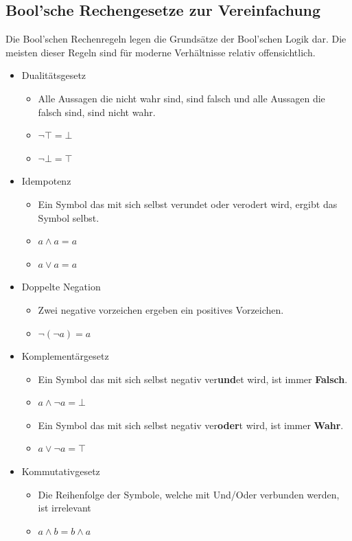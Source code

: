 \documentclass{article}
\begin{document}
		\subsection{Bool'sche Rechengesetze zur Vereinfachung}
		Die Bool'schen Rechenregeln legen die Grundsätze der Bool'schen Logik dar. Die meisten dieser Regeln sind für moderne Verhältnisse relativ offensichtlich.
		\begin{itemize}
			\item{Dualitätsgesetz}
			\begin{itemize}
				\item{Alle Aussagen die nicht wahr sind, sind falsch und alle Aussagen die falsch sind, sind nicht wahr.}
				\item{$\neg\top =\bot$}
				\item{$\neg\bot =\top$}
			\end{itemize}
			\item{Idempotenz}
			\begin{itemize}
				\item{Ein Symbol das mit sich selbst verundet oder verodert wird, ergibt das Symbol selbst.}
				\item{$a\land a=a$}
				\item{$a\lor a=a$}
			\end{itemize}
			\item{Doppelte Negation}
			\begin{itemize}
				\item{Zwei negative vorzeichen ergeben ein positives Vorzeichen.}
				\item{$\neg(\neg a) = a$}
			\end{itemize}
			\item{Komplementärgesetz}
			\begin{itemize}
				\item{Ein Symbol das mit sich selbst negativ ver\textbf{und}et wird, ist immer \textbf{Falsch}.}
				\item{$a\land\neg a = \bot$}
				\item{Ein Symbol das mit sich selbst negativ ver\textbf{oder}t wird, ist immer \textbf{Wahr}.}
				\item{$a\lor\neg a = \top$}
			\end{itemize}
			\item{Kommutativgesetz}
			\begin{itemize}
				\item{Die Reihenfolge der Symbole, welche mit Und/Oder verbunden werden, ist irrelevant}
				\item{$a\land b = b\land a$}

\end{itemize}
\end{itemize}
\end{document}

